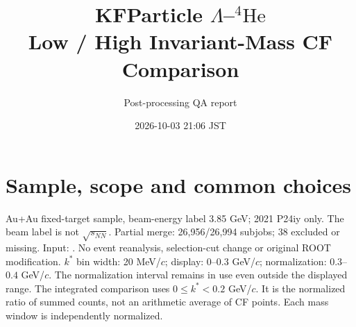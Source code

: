 \documentclass[10pt,a4paper]{article}
\title{KFParticle $\Lambda$--$^{4}\mathrm{He}$\\Low / High Invariant-Mass CF Comparison}
\author{Post-processing QA report}
\date{2026-10-03 21:06 JST}
\begin{document}
\maketitle
\section{Sample, scope and common choices}
Au+Au fixed-target sample, beam-energy label 3.85 GeV; 2021 P24iy only. The beam label is not $\sqrt{s_{NN}}$. Partial merge: 26,956/26,994 subjobs; 38 excluded or missing.
Input: {\small{}}. No event reanalysis, selection-cut change or original ROOT modification.
$k^*$ bin width: 20 MeV/$c$; display: $0$--$0.3$ GeV/$c$; normalization: $0.3$--$0.4$ GeV/$c$. The normalization interval remains in use even outside the displayed range.
The integrated comparison uses $0\leq k^*<0.2$ GeV/$c$. It is the normalized ratio of summed counts, not an arithmetic average of CF points. Each mass window is independently normalized.
\end{document}
